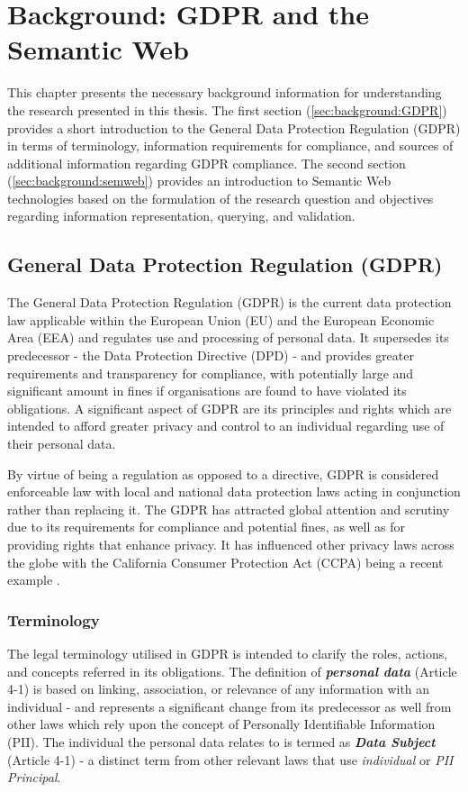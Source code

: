\chapter{Background: GDPR and the Semantic Web}
\label{chapter:background}

This chapter presents the necessary background information for understanding the research presented in this thesis. The first section (\autoref{sec:background:GDPR}) provides a short introduction to the General Data Protection Regulation (GDPR) in terms of terminology, information requirements for compliance, and sources of additional information regarding GDPR compliance.
The second section (\autoref{sec:background:semweb}) provides an introduction to Semantic Web technologies based on the formulation of the research question and objectives regarding information representation, querying, and validation. 

\section{General Data Protection Regulation (GDPR)}\label{sec:background:GDPR}
The General Data Protection Regulation (GDPR) \cite{Regulation_GDPR} is the current data protection law applicable within the European Union (EU) and the European Economic Area (EEA) and regulates use and processing of personal data. 
It supersedes its predecessor - the Data Protection Directive (DPD) \cite{directive_DPD} - and provides greater requirements and transparency for compliance, with potentially large and significant amount in fines if organisations are found to have violated its obligations.
A significant aspect of GDPR are its principles and rights which are intended to afford greater privacy and control to an individual regarding use of their personal data.

By virtue of being a regulation as opposed to a directive, GDPR is considered enforceable law with local and national data protection laws acting in conjunction rather than replacing it.
The GDPR has attracted global attention and scrutiny due to its requirements for compliance and potential fines, as well as for providing rights that enhance privacy.
It has influenced other privacy laws across the globe with the California Consumer Protection Act (CCPA) being a recent example \cite{marini_gdpr_2018}.

\subsection{Terminology}
The legal terminology utilised in GDPR is intended to clarify the roles, actions, and concepts referred in its obligations.
The definition of \textit{\textbf{personal data}} (Article 4-1) is based on linking, association, or relevance of any information with an individual - and represents a significant change from its predecessor as well from other laws which rely upon the concept of Personally Identifiable Information (PII). The individual the personal data relates to is termed as \textit{\textbf{Data Subject}} (Article 4-1) - a distinct term from other relevant laws that use \textit{individual} or \textit{PII Principal}.

